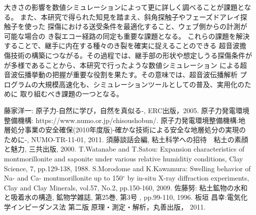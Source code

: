 ﻿\documentclass[11pt,a4j]{mybook2}
\begin{document}
大きさの影響を数値シミュレーションによって更に詳しく調べることが課題となる。
また、本研究で得られた知見を踏まえ、斜角探触子やフェーズドアレイ探触子を使った
探傷における送受条件を最適化すること、ウェブ側からの計測が可能な場合の
き裂エコー経路の同定も重要な課題となる。
これらの課題を解決することで、継手に内在する種々のき裂を確実に捉えることのできる
超音波擔傷技術の構築につながる。その過程では、継手部の形状や想定しうる探傷条件が
が多様であることから、本研究で行ったような数値シミュレーション
による超音波伝播挙動の把握が重要な役割を果たす。その意味では、超音波伝播解析
プログラムの大規模高速化も、シミュレーションツールとしての普及、実用化のために
取り組むべき課題の一つとなる。
\renewcommand{\bibname}{参考文献}
\begin{thebibliography}{99}
	藤家洋一: 原子力-自然に学び，自然を真似る-, ERC出版，2005.
	原子力発電環境整備機構: https://www.numo.or.jp/chisoushobun/.
	原子力発電環境整備機構:地層処分事業の安全確保(2010年度版)-確かな技術による安全な地層処分の実現のために-, NUMO-TR-11-01, 2011.
	須藤談話会編, 粘土科学への招待　粘土の素顔と魅力, 三共出版, 2000.
	T.Watanabe and T.Satou: Expansion characteristics of montmorillonite and saponite under various 
	relative humiditiy conditions, Clay Science, 7, pp.129-138, 1988.
	S.Morodome and K.Kawamura: Swelling behavior of Na- and Ca- montmorillonite up to 150$^\circ$ by in-situ 
	X-ray diffraction experiments, Clay and Clay Minerals, vol.57, No.2, pp.150-160, 2009.
	佐藤努: 粘土鉱物の水和と吸着水の構造, 鉱物学雑誌, 第25巻, 第3号 , pp.99-110, 1996.
	板垣 昌幸:電気化学インピーダンス法 第二版 原理・測定・解析，丸善出版， 2011. 
\end{thebibliography}
\end{document}

